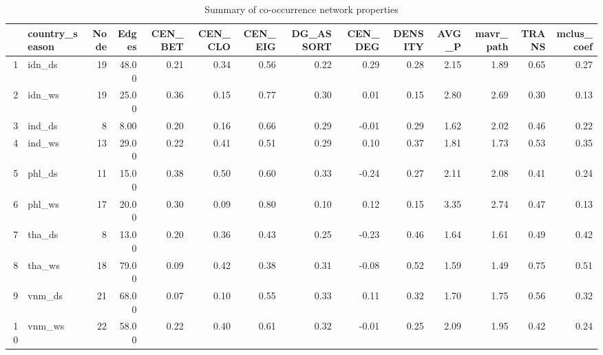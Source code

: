 \begin{landscape}
\begin{table}
\small
\centering
\begin{tabular}{rlrrrrrrrrrrrr}
  \hline
 & country\_season & Node & Edges & CEN\_BET & CEN\_CLO & CEN\_EIG & DG\_ASSORT & CEN\_DEG & DENSITY & AVG\_P & mavr\_path & TRANS & mclus\_coef \\ 
  \hline
1 & idn\_ds &  19 & 48.00 & 0.21 & 0.34 & 0.56 & 0.22 & 0.29 & 0.28 & 2.15 & 1.89 & 0.65 & 0.27 \\ 
  2 & idn\_ws &  19 & 25.00 & 0.36 & 0.15 & 0.77 & 0.30 & 0.01 & 0.15 & 2.80 & 2.69 & 0.30 & 0.13 \\ 
  3 & ind\_ds &   8 & 8.00 & 0.20 & 0.16 & 0.66 & 0.29 & -0.01 & 0.29 & 1.62 & 2.02 & 0.46 & 0.22 \\ 
  4 & ind\_ws &  13 & 29.00 & 0.22 & 0.41 & 0.51 & 0.29 & 0.10 & 0.37 & 1.81 & 1.73 & 0.53 & 0.35 \\ 
  5 & phl\_ds &  11 & 15.00 & 0.38 & 0.50 & 0.60 & 0.33 & -0.24 & 0.27 & 2.11 & 2.08 & 0.41 & 0.24 \\ 
  6 & phl\_ws &  17 & 20.00 & 0.30 & 0.09 & 0.80 & 0.10 & 0.12 & 0.15 & 3.35 & 2.74 & 0.47 & 0.13 \\ 
  7 & tha\_ds &   8 & 13.00 & 0.20 & 0.36 & 0.43 & 0.25 & -0.23 & 0.46 & 1.64 & 1.61 & 0.49 & 0.42 \\ 
  8 & tha\_ws &  18 & 79.00 & 0.09 & 0.42 & 0.38 & 0.31 & -0.08 & 0.52 & 1.59 & 1.49 & 0.75 & 0.51 \\ 
  9 & vnm\_ds &  21 & 68.00 & 0.07 & 0.10 & 0.55 & 0.33 & 0.11 & 0.32 & 1.70 & 1.75 & 0.56 & 0.32 \\ 
  10 & vnm\_ws &  22 & 58.00 & 0.22 & 0.40 & 0.61 & 0.32 & -0.01 & 0.25 & 2.09 & 1.95 & 0.42 & 0.24 \\ 
   \hline
\end{tabular}
   \caption{Summary of co-occurrence network properties}
\label{table:Network_stat}
\end{table}
\end{landscape}
